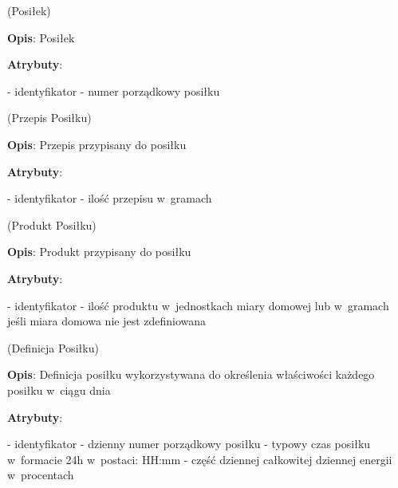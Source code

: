 \begin{enumerate}[label={\textbf{KAT/\protect\threedigits{\theenumi}}}, wide, labelwidth=!, labelindent=0pt, labelsep=0pt, series=reqs]
    \label{kat:Meal} (Posiłek)

    \textbf{Opis}: Posiłek
    \par
    \textbf{Atrybuty}:
    \begin{itemize}[series=atr, wide, align=left, leftmargin=190pt]
        \label{kat:Meal:id}- identyfikator
        \label{kat:Meal:ordinalNumber}- numer porządkowy posiłku
    \end{itemize}

    \label{kat:MealRecipe} (Przepis Posiłku)

    \textbf{Opis}: Przepis przypisany do posiłku
    \par
    \textbf{Atrybuty}:
    \begin{itemize}[series=atr, wide, align=left, leftmargin=190pt]
        \label{kat:MealRecipe:id}- identyfikator
        \label{kat:MealRecipe:amount}- ilość przepisu w~gramach
    \end{itemize}

    \label{kat:MealProduct} (Produkt Posiłku)

    \textbf{Opis}: Produkt przypisany do posiłku
    \par
    \textbf{Atrybuty}:
    \begin{itemize}[series=atr, wide, align=left, leftmargin=190pt]
        \label{kat:MealProduct:id}- identyfikator
        \label{kat:MealProduct:amount}- ilość produktu w~jednostkach miary domowej lub w~gramach jeśli miara domowa nie jest zdefiniowana
    \end{itemize}

    \label{kat:MealDefinition} (Definicja Posiłku)

    \textbf{Opis}: Definicja posiłku wykorzystywana do określenia właściwości każdego posiłku w~ciągu dnia
    \par
    \textbf{Atrybuty}:
    \begin{itemize}[series=atr, wide, align=left, leftmargin=190pt]
        \label{kat:MealDefinition:id}- identyfikator
        \label{kat:MealDefinition:ordinalNumber}- dzienny numer porządkowy posiłku
        \label{kat:MealDefinition:timeOfMeal}- typowy czas posiłku w~formacie 24h w~postaci: HH:mm
        \label{kat:MealDefinition:percentOfEnergy}- część dziennej całkowitej dziennej energii w~procentach
    \end{itemize}


\end{enumerate}
